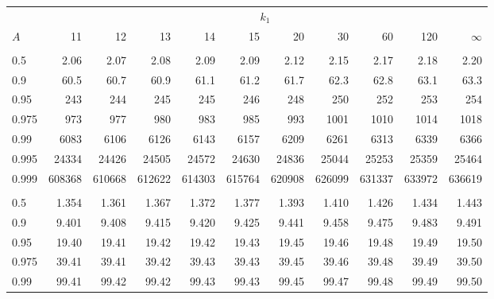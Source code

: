 \documentclass[
]{article}
\begin{document}
\begin{table}[H]
\centering
\begin{tabular}{lrrrrrrrrrr}
\toprule
\multicolumn{1}{c}{ } & \multicolumn{10}{c}{$k_1$} \\
\cmidrule(l{3pt}r{3pt}){2-11}
\hspace{1.1em}$A$ & 11 & 12 & 13 & 14 & 15 & 20 & 30 & 60 & 120 & $\infty$\\
\midrule
\addlinespace[0.3em]
\multicolumn{11}{l}{\textbf{$k_2=1$}}\\
\hspace{1em}0.5 & 2.06 & 2.07 & 2.08 & 2.09 & 2.09 & 2.12 & 2.15 & 2.17 & 2.18 & 2.20\\
\hspace{1em}0.9 & 60.5 & 60.7 & 60.9 & 61.1 & 61.2 & 61.7 & 62.3 & 62.8 & 63.1 & 63.3\\
\hspace{1em}0.95 & 243 & 244 & 245 & 245 & 246 & 248 & 250 & 252 & 253 & 254\\
\hspace{1em}0.975 & 973 & 977 & 980 & 983 & 985 & 993 & 1001 & 1010 & 1014 & 1018\\
\hspace{1em}0.99 & 6083 & 6106 & 6126 & 6143 & 6157 & 6209 & 6261 & 6313 & 6339 & 6366\\
\hspace{1em}0.995 & 24334 & 24426 & 24505 & 24572 & 24630 & 24836 & 25044 & 25253 & 25359 & 25464\\
\hspace{1em}0.999 & 608368 & 610668 & 612622 & 614303 & 615764 & 620908 & 626099 & 631337 & 633972 & 636619\\
\addlinespace[0.3em]
\multicolumn{11}{l}{\textbf{$k_2=2$}}\\
\hspace{1em}0.5 & 1.354 & 1.361 & 1.367 & 1.372 & 1.377 & 1.393 & 1.410 & 1.426 & 1.434 & 1.443\\
\hspace{1em}0.9 & 9.401 & 9.408 & 9.415 & 9.420 & 9.425 & 9.441 & 9.458 & 9.475 & 9.483 & 9.491\\
\hspace{1em}0.95 & 19.40 & 19.41 & 19.42 & 19.42 & 19.43 & 19.45 & 19.46 & 19.48 & 19.49 & 19.50\\
\hspace{1em}0.975 & 39.41 & 39.41 & 39.42 & 39.43 & 39.43 & 39.45 & 39.46 & 39.48 & 39.49 & 39.50\\
\hspace{1em}0.99 & 99.41 & 99.42 & 99.42 & 99.43 & 99.43 & 99.45 & 99.47 & 99.48 & 99.49 & 99.50\\

\end{tabular}
\end{table}
\end{document}
